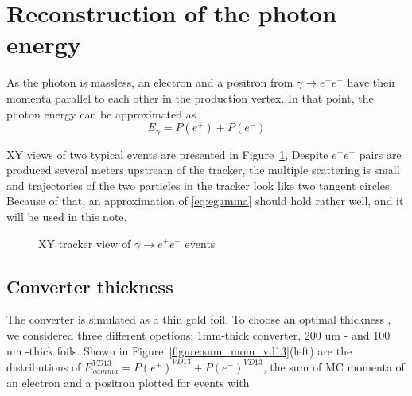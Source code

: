 \section{Reconstruction of the photon energy}

As the photon is massless, an electron and a positron from $\gamma \to e^+e^-$ have their
momenta parallel to each other in the production vertex. In that point, the photon energy
can be approximated as
\begin{equation} \label{eq:egamma}
  E_\gamma = P(e^+) + P(e^-) 
\end{equation}
               
XY views of two typical events are presented in Figure~\ref{figure:rpc07b0s51r0100_xy_view},
Despite $e^+e^-$ pairs are produced several meters upstream of the tracker,
the multiple scattering is small and trajectories of the two particles
in the tracker look like two tangent circles. Because of that, an approximation of \ref{eq:egamma}
should hold rather well, and it will be used in this note.

\begin{figure}[H]
  \caption{
    \label{figure:rpc07b0s51r0100_xy_view}
    XY tracker view of $\gamma \to e^+e^-$ events
  }
\end{figure}

\subsection{Converter thickness}

The converter is simulated as a thin gold foil. To choose an optimal thickness ,
we considered three different opetions: 1mm-thick converter, 200 um - and 100 um -thick foils.
Shown in Figure~\ref{figure:sum_mom_vd13}(left) are the distributions of $E_{gamma}^{VD13} = P(e^+)^{VD13} + P(e^-)^{VD13}$,
the sum of MC momenta of an electron and a positron plotted for events with

